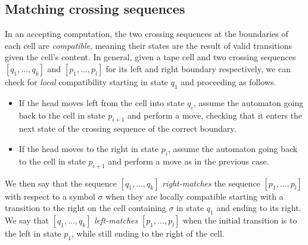 \subsection{Matching crossing sequences}
In an accepting computation, the two crossing sequences at the boundaries of each cell are \emph{compatible}, meaning their states are the result of valid transitions given the cell's content.
In general, given a tape cell and two crossing sequences $[q_1,\dots,q_k]$ and $[p_1,\dots,p_l]$ for its left and right boundary respectively, we can check for \emph{local} compatibility starting in state $q_1$ and proceeding as follows.
\begin{itemize}
	\item If the head moves left from the cell into state $q_i$, assume the automaton going back to the cell in state $p_{i+1}$ and perform a move, checking that it enters the next state of the crossing sequence of the correct boundary.
	\item If the head moves to the right in state $p_i$, assume the automaton going back to the cell in state $p_{i+1}$ and perform a move as in the previous case.
\end{itemize}

We then say that the sequence $[q_1,\dots,q_k]$ \emph{right-matches} the sequence $[p_1,\dots,p_l]$ with respect to a symbol $\sigma$ when they are locally compatible starting with a transition to the right on the cell containing $\sigma$ in state $q_1$ and ending to its right.
We say that $[q_1,\dots,q_k]$ \emph{left-matches} $[p_1,\dots,p_l]$ when the initial transition is to the left in state $p_1$, while still ending to the right of the cell.

